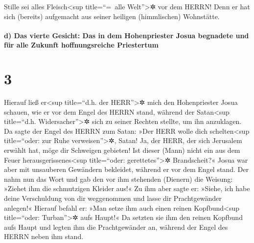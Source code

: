  Stille sei alles Fleisch\textless sup title=``=~alle
Welt''\textgreater✲ vor dem HERRN! Denn er hat sich (bereits) aufgemacht
aus seiner heiligen (himmlischen) Wohnstätte.

\hypertarget{d-das-vierte-gesicht-das-in-dem-hohenpriester-josua-begnadete-und-fuxfcr-alle-zukunft-hoffnungsreiche-priestertum}{%
\paragraph{d) Das vierte Gesicht: Das in dem Hohenpriester Josua
begnadete und für alle Zukunft hoffnungsreiche
Priestertum}\label{d-das-vierte-gesicht-das-in-dem-hohenpriester-josua-begnadete-und-fuxfcr-alle-zukunft-hoffnungsreiche-priestertum}}

\hypertarget{section-2}{%
\section{3}\label{section-2}}

 Hierauf ließ er\textless sup title=``d.h. der
HERR''\textgreater✲ mich den Hohenpriester Josua schauen, wie er vor dem
Engel des HERRN stand, während der Satan\textless sup title=``d.h.
Widersacher''\textgreater✲ sich zu seiner Rechten stellte, um ihn
anzuklagen.  Da sagte der Engel des HERRN zum Satan: »Der
HERR wolle dich schelten\textless sup title=``oder: zur Ruhe
verweisen''\textgreater✲, Satan! Ja, der HERR, der sich Jerusalem
erwählt hat, möge dir Schweigen gebieten! Ist dieser (Mann) nicht ein
aus dem Feuer herausgerissenes\textless sup title=``oder:
gerettetes''\textgreater✲ Brandscheit?«  Josua war aber
mit unsauberen Gewändern bekleidet, während er vor dem Engel stand.
 Der nahm nun das Wort und gab den vor ihm stehenden
(Dienern) die Weisung: »Ziehet ihm die schmutzigen Kleider aus!« Zu ihm
aber sagte er: »Siehe, ich habe deine Verschuldung von dir weggenommen
und lasse dir Prachtgewänder anlegen!«  Hierauf befahl er:
»Man setze ihm auch einen reinen Kopfbund\textless sup title=``oder:
Turban''\textgreater✲ aufs Haupt!« Da setzten sie ihm den reinen
Kopfbund aufs Haupt und legten ihm die Prachtgewänder an, während der
Engel des HERRN neben ihm stand.

